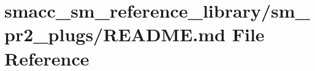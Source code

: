 \hypertarget{smacc__sm__reference__library_2sm__pr2__plugs_2README_8md}{}\section{smacc\+\_\+sm\+\_\+reference\+\_\+library/sm\+\_\+pr2\+\_\+plugs/\+R\+E\+A\+D\+ME.md File Reference}
\label{smacc__sm__reference__library_2sm__pr2__plugs_2README_8md}
